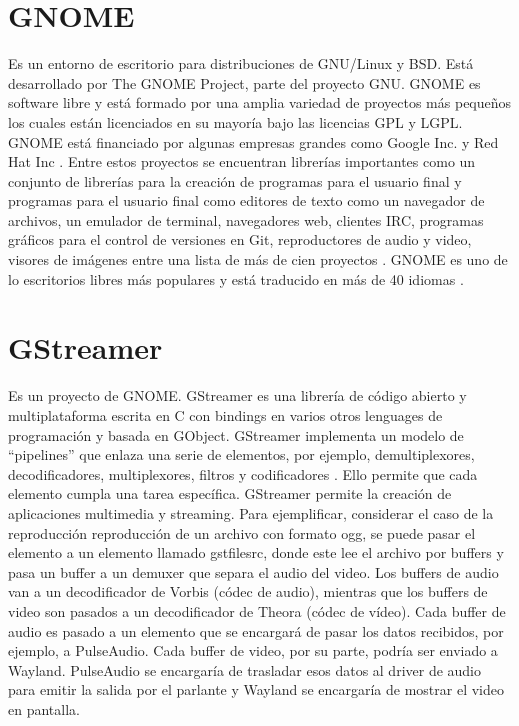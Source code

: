 \documentclass[a4paper,openright,12pt]{report}
\begin{document}
\section{GNOME}
Es un entorno de escritorio para distribuciones de GNU/Linux y BSD. Está
desarrollado por The GNOME Project, parte del proyecto GNU. GNOME es software
libre y está formado por una amplia variedad de proyectos más pequeños los
cuales están licenciados en su mayoría bajo las licencias GPL y LGPL. GNOME
está financiado por algunas empresas grandes como Google Inc. y Red Hat Inc
\cite{GNOMEFoundation}. Entre estos proyectos se encuentran librerías
importantes como un conjunto de librerías para la creación de programas para
el usuario final y programas para el usuario final como editores de texto como
un navegador de archivos, un emulador de terminal, navegadores web, clientes
IRC, programas gráficos para el control de versiones en Git, reproductores de
audio y video, visores de imágenes entre una lista de más de cien proyectos
\cite{GNOMEProjects}. GNOME es uno de lo escritorios libres más populares y
está traducido en más de 40 idiomas \cite{GNOMETranslationTeams}.

\section{GStreamer}
Es un proyecto de GNOME. GStreamer es una librería de código abierto y
multiplataforma escrita en C con bindings en varios otros lenguages de
programación y basada en \gls{GObject}. GStreamer implementa un modelo de
“pipelines” que enlaza una serie de elementos, por ejemplo, demultiplexores,
decodificadores, multiplexores, filtros y codificadores \cite{GStreamerFeatures}.
Ello permite que cada elemento cumpla una tarea específica. GStreamer permite
la creación de aplicaciones multimedia y streaming. Para ejemplificar,
considerar el caso de la reproducción reproducción de un archivo con formato
ogg, se puede pasar el elemento a un elemento llamado gstfilesrc, donde este lee
el archivo por buffers y pasa un buffer a un demuxer que separa el audio del
video. Los buffers de audio van a un decodificador de Vorbis (códec de audio),
mientras que los buffers de video son pasados a un decodificador de Theora
(códec de vídeo).
Cada buffer de audio es pasado a un elemento que se encargará de pasar los datos
recibidos, por ejemplo, a PulseAudio. Cada buffer de video, por su parte, podría
ser enviado a Wayland. PulseAudio se encargaría de trasladar esos datos al
driver de audio para emitir la salida por el parlante y Wayland se encargaría
de mostrar el video en pantalla.
\end{document}

